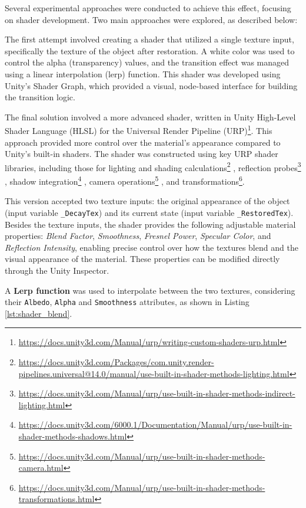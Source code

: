 Several experimental approaches were conducted to achieve this effect, focusing on shader development.
Two main approaches were explored, as described below:

The first attempt involved creating a shader that utilized a single texture input, specifically the texture of the object after restoration. A white color was used to control the alpha (transparency) values, and the transition effect was managed using a linear interpolation (lerp) function. This shader was developed using Unity’s Shader Graph, which provided a visual, node-based interface for building the transition logic.


The final solution involved a more advanced shader, written in Unity High-Level Shader Language (HLSL) for the Universal Render Pipeline (URP)\footnote{\url{https://docs.unity3d.com/Manual/urp/writing-custom-shaders-urp.html}}. 
This approach provided more control over the material's appearance compared to Unity's built-in shaders.
The shader was constructed using key URP shader libraries, including those for lighting and shading calculations\footnote{\url{https://docs.unity3d.com/Packages/com.unity.render-pipelines.universal@14.0/manual/use-built-in-shader-methods-lighting.html}}
, reflection probes\footnote{\url{https://docs.unity3d.com/Manual/urp/use-built-in-shader-methods-indirect-lighting.html}}
, shadow integration\footnote{\url{https://docs.unity3d.com/6000.1/Documentation/Manual/urp/use-built-in-shader-methods-shadows.html}}
, camera operations\footnote{\url{https://docs.unity3d.com/Manual/urp/use-built-in-shader-methods-camera.html}}
, and transformations\footnote{\url{https://docs.unity3d.com/Manual/urp/use-built-in-shader-methods-transformations.html}}.

This version accepted two texture inputs: the original appearance of the object (input variable \texttt{\_DecayTex}) and its current state (input variable \texttt{\_RestoredTex}).
Besides the texture inputs, the shader provides the following adjustable material properties: \emph{Blend Factor}, \emph{Smoothness}, \emph{Fresnel Power}, \emph{Specular Color}, and \emph{Reflection Intensity}, enabling precise control over how the textures blend and the visual appearance of the material. 
These properties can be modified directly through the Unity Inspector.

A \textbf{Lerp function} was used to interpolate between the two textures, considering their \texttt{Albedo}, \texttt{Alpha} and \texttt{Smoothness} attributes, as shown in Listing \ref{lst:shader_blend}. %

